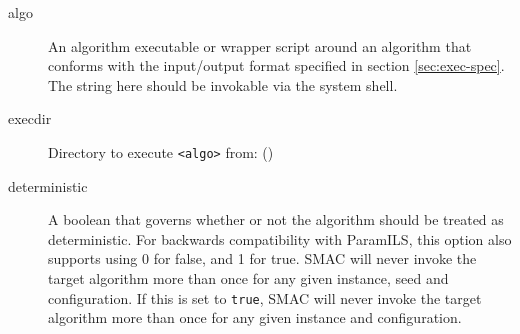 \documentclass[manual.tex]{subfiles}
\begin{document}
\begin{description}
\item [algo] An algorithm executable or wrapper script around
an algorithm that conforms with the input/output format specified
in section \ref{sec:exec-spec}. The string here should be invokable via the system shell.
\item [{execdir}] Directory to execute \texttt{<algo>} from: ()
\item [{deterministic}] A boolean that governs whether or not the algorithm should be treated as deterministic. For backwards compatibility with ParamILS, this option also supports using 0 for false, and 1 for true. SMAC will never invoke the target algorithm more than once for any given instance, seed and configuration. If this is set to \texttt{true}, SMAC will never invoke the target algorithm more than once for any given instance and configuration.


\end{description}
\end{document}
